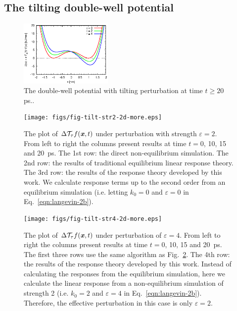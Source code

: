 \documentclass[aip,jcp,a4paper,reprint,onecolumn]{revtex4-1}
\newcommand{\vect}[1]{\textbf{\textit{#1}}}
\newcommand{\eps}{\varepsilon}
\newcommand{\mt}{\mathcal T}
\begin{document}
\subsection{The tilting double-well potential}

\begin{figure}
  \centering
  \includegraphics[width=0.4\textwidth]{figs/fig-tilt-pot.eps}
  \caption{The double-well potential with tilting perturbation at
    time $t\geq 20$ ps..}
  \label{fig:tmp1}
\end{figure}

\begin{figure}
  \centering
  \texttt{[image: figs/fig-tilt-str2-2d-more.eps]}
  \caption{The plot of $\Delta\mt_\tau f(\vect x,t)$ under
    perturbation with strength $\eps = 2$.  From left to right the
    columns present results at time $t = 0$, 10, 15 and
    20~\textsf{ps}.  The 1st row: the direct non-equilibrium
    simulation. The 2nd row: the results of traditional equilibrium
    linear response theory.  The 3rd row: the results of the response
    theory developed by this work.  We calculate response terms up to
    the second order from an equilibrium simulation (i.e. letting $k_0
    = 0$ and $\eps = 0$ in Eq.~\eqref{eqn:langevin-2b}).
  }
  \label{fig:tmp2}
\end{figure}

\begin{figure}
  \centering
  \texttt{[image: figs/fig-tilt-str4-2d-more.eps]}
  \caption{The plot of $\Delta\mt_\tau f(\vect x,t)$  under perturbation of
    $\eps = 4$. From left to right the
    columns present results at time $t = 0$, 10, 15 and
    20~\textsf{ps}.
    The first three rows use the same algorithm as Fig.~\ref{fig:tmp2}.    
    The 4th row: the results of the response theory developed by this work.
    Instead of calculating the responses from the equilibrium simulation,
    here we calculate the linear response from a non-equilibrium simulation
    of strength 2 (i.e. $k_0 = 2$ and $\eps = 4$
    in Eq.~\eqref{eqn:langevin-2b}).
    Therefore, the effective perturbation in this case is only
    $\eps = 2$.
  }
  \label{fig:tmp3}
\end{figure}
\end{document}
